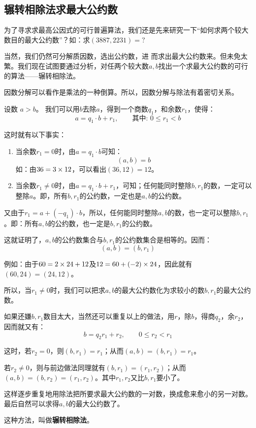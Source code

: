 \subsection{辗转相除法求最大公约数}

为了寻求求最高公因式的可行普遍算法，我们还是先来研究一下“如何求两个较大数目的最大公约数”？如：求$(3887, 2231)=?$

当然，我们仍然可分解质因数，选出公约数，进
而求出最大公约数来。但未免太繁。我们现在试图要通过分析，对任两个较大数$a,b$找出一个求最大公约数的可行的算法——辗转相除法。

\begin{analyze}
 因数分解可以看作是乘法的一种倒算。所以，因数分解与除法有着密切关系。

设数 $a>b$。 我们可以用$b$去除$a$，得到一个商数$q_1$，和余数$r_1$，使得：
$$a=q_1\cdot b+r_1,\qquad \text{其中: }0\le r_1<b$$

这时就有以下事实：
\begin{enumerate}
    \item 当余数$r_1=0$时，由$a=q_1\cdot b$可知：
    \[(a,b) =b\]
    如：由$36=3\times12$，可以看出$(36, 12)=12$。

\item 当余数$r_1\ne 0$时，由$a=q_1\cdot b+r_1$，可知；任何能同时整除$b,r_1$的数，一定可以整除$a$。即，所有$b,r_1$的公约数，一定也是$a,b$的公约数。
\end{enumerate}

又由于$r_1=a+(-q_1)\cdot b$，所以，任何能同时整除$a,b$的数，也一定可以整除$b,r_1$。即：所有$a,b$的公约数，也一定是$b,r_1$的公约数。

这就证明了，$a,b$的公约数集合与$b,r_1$的公约数集合是相等的。因而：   
\[(a,b)=(b,r_1)  \]

例如：由于$60=2\times 24+12$及$12=60+(-2)\times 24$，因此就有$(60,24)=(24,12)$。

所以，当$r_1\ne 0$时，我们可以把求$a,b$的最大公约数化为求较小的数$b,r_1$的最大公约数。

如果还嫌$b,r_1$数目太大，当然还可以重复以上的做法，用$r$，除$b$，得商$q_2$，余$r_2$，因而就又有：
\[b=q_2r_1 +r_2,\qquad  0\le r_2<r_1\]

这时，若$r_2=0$，则$(b,r_1)=r_1$；从而$(a,b)= (b,r_1) =r_1$。

若$r_2\ne 0$，则与前边做法同理就有$(b,r_1)=(r_1, r_2)$；从而$(a,b)=(b,r_2)=(r_1,r_2)$。其中$r_1,r_2$又比$b,r_1$要小了。

这样逐步重复地用除法把所要求最大公约数的一对数，换成愈来愈小的另一对数。最后自然可以求得$a,b$的最大公约数了。

这种方法，叫做\textbf{辗转相除法}。
\end{analyze}


